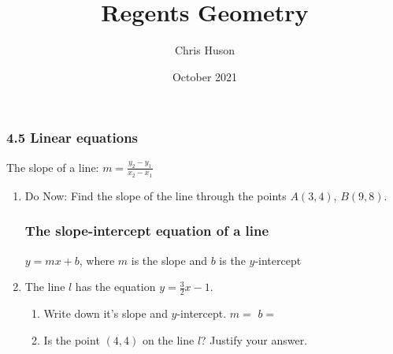 \documentclass[12pt, twoside]{article}
\title{Regents Geometry}
\author{Chris Huson}
\date{October 2021}
\begin{document}
\subsubsection*{4.5 Linear equations}
The slope of a line: $\displaystyle m=\frac{y_2-y_1}{x_2-x_1}$
\begin{enumerate}
\item Do Now: Find the slope of the line through the points $A(3,4)$, $B(9,8)$.
\begin{flushleft}
  \end{flushleft}

\subsubsection*{The slope-intercept equation of a line}
$y=mx+b$, where $m$ is the slope and $b$ is the $y$-intercept
\item The line $l$ has the equation $y=\frac{3}{2}x-1$. 
\begin{enumerate}
  \item Write down it's slope and $y$-intercept. \hspace{2cm} $m=$
  \hspace{2cm} $b=$
  \item Is the point $(4, 4)$ on the line $l$? Justify your answer.
\end{enumerate}
\vspace{2cm}


\end{enumerate}
\end{document}
